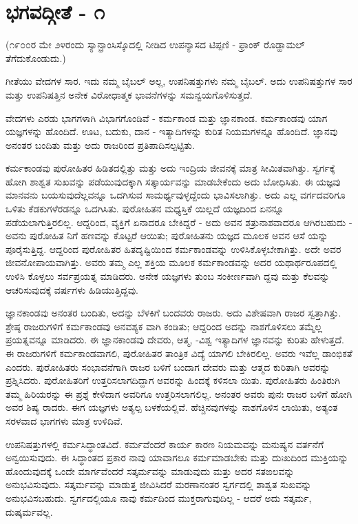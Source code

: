 
\chapter{ಭಗವದ್ಗೀತೆ - ೧}

(೧೯೦೦ರ ಮೇ ೨೪ರಂದು ಸ್ಯಾನ್ಫ್ರಾಂಸಿಸ್ಕೊದಲ್ಲಿ ನೀಡಿದ ಉಪನ್ಯಾಸದ ಟಿಪ್ಪಣಿ - ಫ್ರಾಂಕ್ ರೊಡ್ಹಾಮಲ್ ತೆಗೆದುಕೊಂಡುದು.)

ಗೀತೆಯು ವೇದಗಳ ಸಾರ. ಇದು ನಮ್ಮ ಬೈಬಲ್ ಅಲ್ಲ, ಉಪನಿಷತ್ತುಗಳು ನಮ್ಮ ಬೈಬಲ್. ಅದು ಉಪನಿಷತ್ತುಗಳ ಸಾರ ಮತ್ತು ಉಪನಿಷತ್ತಿನ ಅನೇಕ ವಿರೋಧಾತ್ಮಕ ಭಾವನೆಗಳನ್ನು ಸಮನ್ವಯಗೊಳಿಸುತ್ತದೆ.

ವೇದಗಳು ಎರಡು ಭಾಗಗಳಾಗಿ ವಿಭಾಗಗೊಂಡಿವೆ - ಕರ್ಮಕಾಂಡ ಮತ್ತು ಜ್ಞಾನಕಾಂಡ. ಕರ್ಮಕಾಂಡವು ಯಾಗ ಯಜ್ಞಗಳನ್ನು ಹೊಂದಿದೆ. ಊಟ, ಬದುಕು, ದಾನ - ಇತ್ಯಾದಿಗಳನ್ನು ಕುರಿತ ನಿಯಮಗಳನ್ನೂ ಹೊಂದಿದೆ. ಜ್ಞಾನವು ಅನಂತರ ಬಂದಿತು ಮತ್ತು ಅದು ರಾಜರಿಂದ ಪ್ರತಿಪಾದಿಸಲ್ಪಟ್ಟಿತು.

ಕರ್ಮಕಾಂಡವು ಪುರೋಹಿತರ ಹಿಡಿತದಲ್ಲಿತ್ತು ಮತ್ತು ಅದು ಇಂದ್ರಿಯ ಜೀವನಕ್ಕೆ ಮಾತ್ರ ಸೀಮಿತವಾಗಿತ್ತು. ಸ್ವರ್ಗಕ್ಕೆ ಹೋಗಿ ಶಾಶ್ವತ ಸುಖವನ್ನು ಪಡೆಯುವುದಕ್ಕಾಗಿ ಸತ್ಕಾರ್ಯವನ್ನು ಮಾಡಬೇಕೆಂದು ಅದು ಬೋಧಿಸಿತು. ಈ ಯಜ್ಞವು ಮಾನವನು ಬಯಸುವುದೆಲ್ಲವನ್ನೂ ಒದಗಿಸುವ ಸಾಮರ್ಥ್ಯವುಳ್ಳದ್ದೆಂದು ಭಾವಿಸಲಾಗಿತ್ತು. ಅದು ಎಲ್ಲ ವರ್ಗದವರಿಗೂ ಒಳಿತು ಕೆಡಕುಗಳೆರಡನ್ನೂ ಒದಗಿಸಿತು. ಪುರೋಹಿತನ ಮಧ್ಯಸ್ತಿಕೆ ಯಿಲ್ಲದೆ ಯಜ್ಞದಿಂದ ಏನನ್ನೂ ಪಡೆಯಲಾಗುತ್ತಿರಲಿಲ್ಲ. ಆದ್ದರಿಂದ, ವ್ಯಕ್ತಿಗೆ ಏನಾದರೂ ಬೇಕಿದ್ದರೆ - ಅದು ಅವನ ಶತ್ರುನಾಶವಾದರೂ ಆಗಿರಬಹುದು - ಅವನು ಪುರೋಹಿತ ನಿಗೆ ಹಣವನ್ನು ಕೊಟ್ಟರೆ ಆಯಿತು; ಪುರೋಹಿತನು ಯಜ್ಞದ ಮೂಲಕ ಅವನ ಆಸೆ ಯನ್ನು ಪೂರೈಸುತ್ತಿದ್ದ. ಆದ್ದರಿಂದ ಪುರೋಹಿತರ ಹಿತದೃಷ್ಟಿಯಿಂದ ಕರ್ಮಕಾಂಡವನ್ನು ಉಳಿಸಿಕೊಳ್ಳಬೇಕಾಗಿತ್ತು. ಅದೇ ಅವರ ಜೀವನೋಪಾಯವಾಗಿತ್ತು. ಅವರು ತಮ್ಮ ಎಲ್ಲ ಶಕ್ತಿಯ ಮೂಲಕ ಕರ್ಮಕಾಂಡವನ್ನು ಅದರ ಯಥಾರ್ಥರೂಪದಲ್ಲಿ ಉಳಿಸಿ ಕೊಳ್ಳಲು ಸರ್ವಪ್ರಯತ್ನ ಮಾಡಿದರು. ಅನೇಕ ಯಜ್ಞಗಳು ತುಂಬ ಸಂಕೀರ್ಣವಾಗಿ ದ್ದವು ಮತ್ತು ಕೆಲವನ್ನು ಆಚರಿಸುವುದಕ್ಕೆ ವರ್ಷಗಳು ಹಿಡಿಯುತ್ತಿದ್ದವು.

ಜ್ಞಾನಕಾಂಡವು ಅನಂತರ ಬಂದಿತು, ಅದನ್ನು ಬೆಳಕಿಗೆ ಬಂದವರು ರಾಜರು. ಅದು ವಿಶೇಷವಾಗಿ ರಾಜರ ಸ್ವತ್ತಾಗಿತ್ತು. ಶ್ರೇಷ್ಠ ರಾಜರುಗಳಿಗೆ ಕರ್ಮಕಾಂಡವು ಅನವಶ್ಯಕ ವಾಗಿ ಕಂಡಿತು; ಆದ್ದರಿಂದ ಅದನ್ನು ನಾಶಗೊಳಿಸಲು ತಮ್ಮೆಲ್ಲ ಪ್ರಯತ್ನವನ್ನೂ ಮಾಡಿದರು. ಈ ಜ್ಞಾನಕಾಂಡವು ದೇವರು, ಆತ್ಮ, -ವಿಶ್ವ ಇತ್ಯಾದಿಗಳ ಜ್ಞಾನವನ್ನು ಕುರಿತು ಹೇಳುತ್ತದೆ. ಈ ರಾಜರುಗಳಿಗೆ ಕರ್ಮಕಾಂಡವಾಗಲಿ, ಪುರೋಹಿತರ ತಾಂತ್ರಿಕ ವಿದ್ಯೆ ಯಾಗಲಿ ಬೇಕಿರಲಿಲ್ಲ. ಅವರು ಇವೆಲ್ಲ ಡಾಂಭಿಕತೆ ಎಂದರು. ಪುರೋಹಿತರು ಸಂಭಾವನೆಗಾಗಿ ರಾಜರ ಬಳಿಗೆ ಬಂದಾಗ ದೇವರು ಮತ್ತು ಆತ್ಮದ ಕುರಿತಾಗಿ ಅವರನ್ನು ಪ್ರಶ್ನಿಸಿದರು. ಪುರೋಹಿತರಿಗೆ ಉತ್ತರಿಸಲಾಗದಿದ್ದಾಗ ಅವರನ್ನು ಹಿಂದಕ್ಕೆ ಕಳಿಸಲಾ ಯಿತು. ಪುರೋಹಿತರು ಹಿಂತಿರುಗಿ ತಮ್ಮ ಹಿರಿಯರನ್ನು ಈ ಪ್ರಶ್ನೆ ಕೇಳಿದಾಗ ಅವರಿಗೂ ಉತ್ತರಿಸಲಾಗಲಿಲ್ಲ. ಅನಂತರ ಅವರು ಪುನಃ ರಾಜರ ಬಳಿಗೆ ಹೋಗಿ ಅವರ ಶಿಷ್ಯ ರಾದರು. ಈಗ ಯಜ್ಞಗಳು ಅತ್ಯಲ್ಪ ಬಳಕೆಯಲ್ಲಿವೆ. ಹೆಚ್ಚಿನವುಗಳನ್ನು ನಾಶಗೊಳಿಸ ಲಾಯಿತು, ಅತ್ಯಂತ ಸರಳವಾದ ಭಾಗಗಳು ಮಾತ್ರ ಉಳಿದಿವೆ.

ಉಪನಿಷತ್ತುಗಳಲ್ಲಿ ಕರ್ಮಸಿದ್ಧಾಂತವಿದೆ. ಕರ್ಮವೆಂದರೆ ಕಾರ್ಯ ಕಾರಣ ನಿಯಮವನ್ನು ಮನುಷ್ಯನ ವರ್ತನೆಗೆ ಅನ್ವಯಿಸುವುದು. ಈ ಸಿದ್ಧಾಂತದ ಪ್ರಕಾರ ನಾವು ಯಾವಾಗಲೂ ಕರ್ಮಮಾಡಬೇಕು ಮತ್ತು ದುಃಖದಿಂದ ಮುಕ್ತಿಯನ್ನು ಹೊಂದುವುದಕ್ಕೆ ಒಂದೇ ಮಾರ್ಗವೆಂದರೆ ಸತ್ಕರ್ಮವನ್ನು ಮಾಡುವುದು ಮತ್ತು ಅದರ ಸತಙಲವನ್ನು ಅನುಭವಿಸುವುದು. ಸತ್ಕರ್ಮವನ್ನು ಮಾಡುತ್ತ ಜೀವಿಸಿದರೆ ಮರಣಾನಂತರ ಸ್ವರ್ಗದಲ್ಲಿ ಶಾಶ್ವತ ಸುಖವನ್ನು ಅನುಭವಿಸಬಹುದು. ಸ್ವರ್ಗದಲ್ಲಿಯೂ ನಾವು ಕರ್ಮದಿಂದ ಮುಕ್ತರಾಗುವುದಿಲ್ಲ - ಆದರೆ ಅದು ಸತ್ಕರ್ಮ, ದುಷ್ಕರ್ಮವಲ್ಲ.

